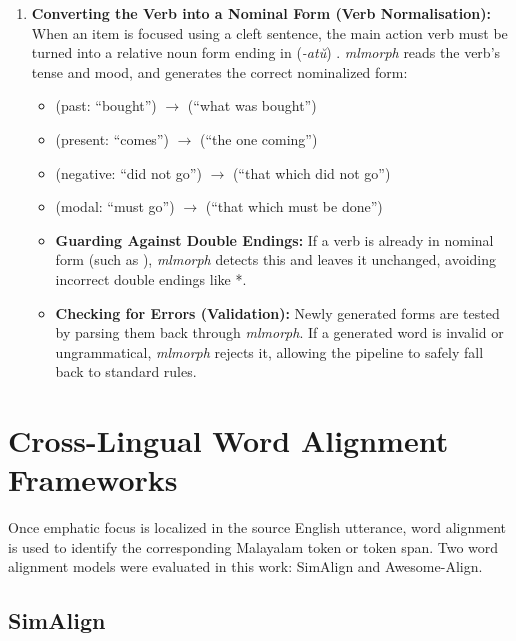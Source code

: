 \begin{enumerate}
    \item \textbf{Converting the Verb into a Nominal Form (Verb Normalisation):}\\
    When an item is focused using a cleft sentence, the main action verb must be turned into a relative noun form ending in  (\textit{-atŭ}) \citep{moag2002malayalam}. \textit{mlmorph} reads the verb's tense and mood, and generates the correct nominalized form:
    \begin{itemize}[noitemsep]
        \item {} (past: ``bought'') $\longrightarrow$  (``what was bought'')
        \item {} (present: ``comes'') $\longrightarrow$  (``the one coming'')
        \item {} (negative: ``did not go'') $\longrightarrow$  (``that which did not go'')
        \item {} (modal: ``must go'') $\longrightarrow$  (``that which must be done'')
        \item \textbf{Guarding Against Double Endings:} If a verb is already in nominal form (such as ), \textit{mlmorph} detects this and leaves it unchanged, avoiding incorrect double endings like *.
        \item \textbf{Checking for Errors (Validation):} Newly generated forms are tested by parsing them back through \textit{mlmorph}. If a generated word is invalid or ungrammatical, \textit{mlmorph} rejects it, allowing the pipeline to safely fall back to standard rules.
    \end{itemize}
\end{enumerate}



\section{Cross-Lingual Word Alignment Frameworks}
\label{sec:alignment_frameworks}

Once emphatic focus is localized in the source English utterance, word
alignment is used to identify the corresponding Malayalam token or token
span. Two word alignment models were evaluated in this work: SimAlign and
Awesome-Align.

\subsection{SimAlign}

